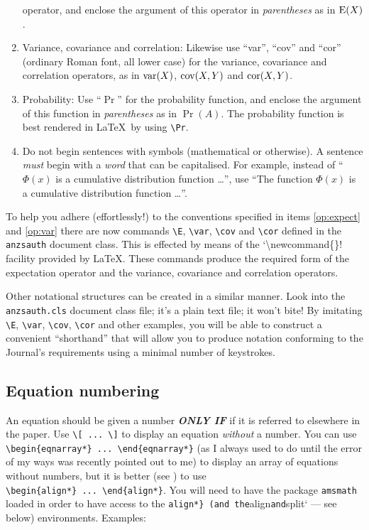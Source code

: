 \documentclass[
  times,
  doublespace]{anzsauth}
\begin{document}
\begin{enumerate}
  operator, and enclose the argument of this operator in
  \emph{parentheses} as in \(\mbox{$\textrm{\textup{E}}$}(X)\). \label{op:expect}
\item
  Variance, covariance and correlation: Likewise use ``var'', ``cov''
  and ``cor'' (ordinary Roman font, all lower case) for the variance,
  covariance and correlation operators, as in \(\mbox{$\textrm{\textup{var}}$}(X)\), \(\mbox{$\textrm{\textup{cov}}$}(X,Y)\)
  and \(\mbox{$\textrm{\textup{cor}}$}(X,Y)\). \label{op:var}
\item
  Probability: Use ``\(\Pr\)'' for the probability function, and enclose
  the argument of this function in \emph{parentheses} as in \(\Pr(A)\).
  The probability function is best rendered in \LaTeX~by using
  \texttt{\textbackslash{}Pr}.
\item
  Do not begin sentences with symbols (mathematical or otherwise). A
  sentence \emph{must} begin with a \emph{word} that can be capitalised.
  For example, instead of ``\(\Phi(x)\) is a cumulative distribution
  function \ldots'', use ``The function \(\Phi(x)\) is a cumulative
  distribution function \ldots''.
\end{enumerate}

To help you adhere (effortlessly!) to the conventions specified in items
\ref{op:expect} and \ref{op:var} there are now commands
\texttt{\textbackslash{}E}, \texttt{\textbackslash{}var},
\texttt{\textbackslash{}cov} and \texttt{\textbackslash{}cor} defined in
the \texttt{anzsauth} document class. This is effected by means of the
`\textbackslash newcommand\{\}! facility provided by \LaTeX. These
commands produce the required form of the expectation operator and the
variance, covariance and correlation operators.

Other notational structures can be created in a similar manner. Look
into the \texttt{anzsauth.cls} document class file; it's a plain text
file; it won't bite! By imitating \texttt{\textbackslash{}E},
\texttt{\textbackslash{}var}, \texttt{\textbackslash{}cov},
\texttt{\textbackslash{}cor} and other examples, you will be able to
construct a convenient ``shorthand'' that will allow you to produce
notation conforming to the Journal's requirements using a minimal number
of keystrokes.

\subsection{Equation numbering}\label{sec:eqnNumb}

An equation should be given a number \textbf{\emph{ONLY IF}} if it is
referred to elsewhere in the paper. Use
\texttt{\textbackslash{}{[}\ ...\ \textbackslash{}{]}} to display an
equation \emph{without} a number. You can use
\texttt{\textbackslash{}begin\{eqnarray*\}\ ...\ \textbackslash{}end\{eqnarray*\}}
(as I always used to do until the error of my ways was recently pointed
out to me) to display an array of equations without numbers, but it is
better (see \citealt{Madsen2006}) to use
\texttt{\textbackslash{}begin\{align*\}\ ...\ \textbackslash{}end\{align*\}}.
You will need to have the package \texttt{amsmath} loaded in order to
have access to the \texttt{align*\}\ (and\ the}align\texttt{and}split`
--- see below) environments. Examples:
\end{document}
